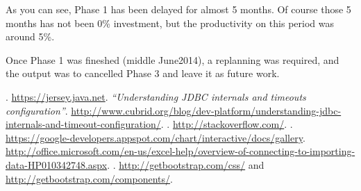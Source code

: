 \documentclass[a4paper,12pt,english]{book}
\begin{document}
As you can see, Phase 1 has been delayed for almost 5 months. Of course those 5
months has not been 0\% investment, but the productivity on this period was
around 5\%.

Once Phase 1 was fineshed (middle June\/2014), a replanning was required, and
the output was to cancelled Phase 3 and leave it as future work.

%
%




\cleardoublepage
{}
{}
\begin{thebibliography}{1}

	. \url{https://jersey.java.net}.
	\bibitem{}{} 
		{\em ``Understanding JDBC internals and timeouts configuration''}.
		\url{http://www.cubrid.org/blog/dev-platform/understanding-jdbc-internals-and-timeout-configuration/}.
	. \url{http://stackoverflow.com/}.
	.
	\url{https://google-developers.appspot.com/chart/interactive/docs/gallery}.
	\url{http://office.microsoft.com/en-us/excel-help/overview-of-connecting-to-importing-data-HP010342748.aspx}.
	. \url{http://getbootstrap.com/css/}
	and \url{http://getbootstrap.com/components/}.
\end{thebibliography}
\end{document}
